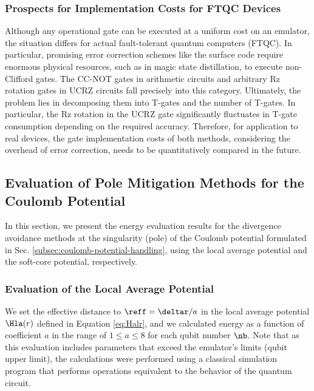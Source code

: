 \documentclass[manuscript_main.tex]{subfiles}
\begin{document}
\subsubsection{Prospects for Implementation Costs for FTQC Devices}
Although any operational gate can be executed at a uniform cost on an emulator,
the situation differs for actual fault-tolerant quantum computers (FTQC). In
particular, promising error correction schemes like the surface code require
enormous physical resources, such as in magic state distillation, to execute
non-Clifford gates. The CC-NOT gates in arithmetic circuits and arbitrary Rz
rotation gates in UCRZ circuits fall precisely into this category. Ultimately,
the problem lies in decomposing them into T-gates and the number of T-gates. In
particular, the Rz rotation in the UCRZ gate significantly fluctuates in T-gate
consumption depending on the required accuracy. Therefore, for application to
real devices, the gate implementation costs of both methods, considering the
overhead of error correction, needs to be quantitatively compared in the future.


\subsection{Evaluation of Pole Mitigation Methods for the Coulomb Potential}
\label{subsec:coulomb-potential-handling-results}
In this section, we present the energy evaluation results for the divergence
avoidance methods at the singularity (pole) of the Coulomb potential formulated
in Sec. \ref{subsec:coulomb-potential-handling}, using the local
average potential and the soft-core potential, respectively.

\subsubsection{Evaluation of the Local Average Potential}
\label{subsubsec:local-average-potential-results}

We set the effective distance to $\reff = \deltar/a$ in the local average
potential $\Hla(r)$ defined in Equation \eqref{eq:Halr}, and we calculated
energy as a function of coefficient $a$ in the range of $1 \le a \le 8$ for
each qubit number $\nb$. Note that as this evaluation includes parameters
that exceed the emulator's limits (qubit upper limit), the calculations were
performed using a classical simulation program that performs operations
equivalent to the behavior of the quantum circuit.
\end{document}
